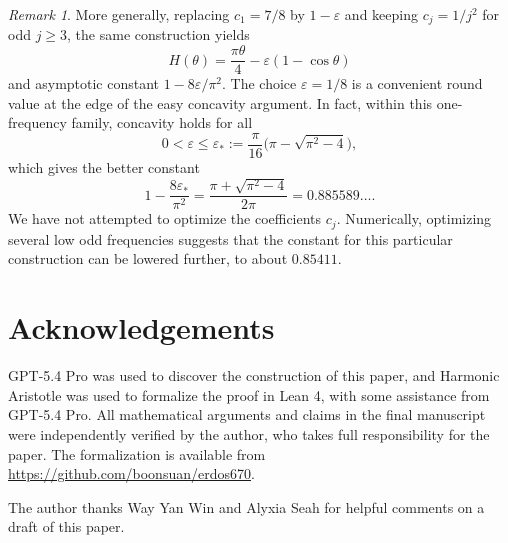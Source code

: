 \documentclass[twoside, reqno, 12pt]{amsart}
\theoremstyle{definition}
\theoremstyle{remark}
\newtheorem{remark}[theorem]{Remark}
\begin{document}
\begin{remark}
More generally, replacing $c_1=7/8$ by $1-\varepsilon$ and keeping
$c_j=1/j^2$ for odd $j\ge3$, the same construction yields
\[
H(\theta)=\frac{\pi\theta}{4}-\varepsilon(1-\cos\theta)
\]
and asymptotic constant $1-8\varepsilon/\pi^2$.
The choice $\varepsilon=1/8$ is a convenient round value at the edge of the
easy concavity argument.
In fact, within this one-frequency family, concavity holds for all
\[
0<\varepsilon\le \varepsilon_*:=\frac{\pi}{16}\bigl(\pi-\sqrt{\pi^2-4}\bigr),
\]
which gives the better constant
\[
1-\frac{8\varepsilon_*}{\pi^2}
=\frac{\pi+\sqrt{\pi^2-4}}{2\pi}
=0.885589\ldots.
\]
We have not attempted to optimize the coefficients $c_j$.
Numerically, optimizing several low odd frequencies suggests that the constant
for this particular construction can be lowered further, to about $0.85411$.
\end{remark}


\section*{Acknowledgements}
GPT-5.4 Pro was used to discover the construction of this paper, and Harmonic Aristotle was used to formalize the proof in Lean 4, with some assistance from GPT-5.4 Pro. 
All mathematical arguments and claims in the final manuscript were independently
verified by the author, who takes full responsibility for the paper.  
The formalization is available from \url{https://github.com/boonsuan/erdos670}.

The author thanks Way Yan Win and Alyxia Seah for helpful comments on a draft of this paper.
\end{document}

